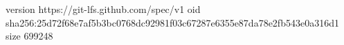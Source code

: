 version https://git-lfs.github.com/spec/v1
oid sha256:25d72f68e7af5b3bc0768dc92981f03c67287e6355e87da78e2fb543e0a316d1
size 699248
